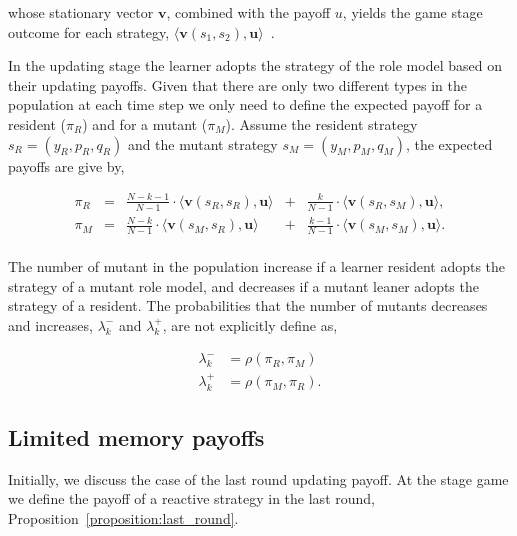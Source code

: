 \documentclass[11pt]{article}
\theoremstyle{plainCl1}
\theoremstyle{plainCl2}
\begin{document}
whose stationary vector \(\mathbf{v}\), combined with the payoff \(u\), yields
the game stage outcome for each strategy,
\(\langle\mathbf{v}(s_1,s_2),\mathbf{u}\rangle\)~\cite{Hauert1997}.


In the updating stage the learner adopts the strategy of the role model based on
their updating payoffs. Given that there are only two different types in the
population at each time step we only need to define the expected payoff for a
resident (\(\pi_R\)) and for a mutant (\(\pi_M\)). Assume the resident strategy
\(s_R = (y_R, p_R, q_R)\) and the mutant strategy \(s_M = (y_M, p_M, q_M)\), the
expected payoffs are give by,

\begin{equation} \label{Eq:ExpPay}
  \begin{array}{lcrcr}
  \displaystyle \pi_R	&=	&\displaystyle \frac{N\!-\!k\!-\!1}{N-1}\cdot \langle\mathbf{v}(s_R,s_R),\mathbf{u}\rangle	&+	&\displaystyle\frac{k}{N-1}\cdot \langle\mathbf{v}(s_R,s_M),\mathbf{u}\rangle,\\[0.5cm]
  \displaystyle \pi_M	&=	&\displaystyle\frac{N-k}{N-1}\cdot \langle\mathbf{v}(s_M,s_R),\mathbf{u}\rangle&+	&\displaystyle\frac{k-1}{N-1}\cdot \langle\mathbf{v}(s_M,s_M),\mathbf{u}\rangle.\\
  \end{array}
\end{equation}

The number of mutant in the population increase if a learner resident adopts the
strategy of a mutant role model, and decreases if a mutant leaner adopts the
strategy of a resident. The probabilities that the number of mutants decreases
and increases, \(\lambda^-_k\) and \(\lambda^+_k\), are not explicitly define
as,

\begin{align*} 
  \lambda^-_k &\!=\!\rho(\pi_R, \pi_M) \\
  \lambda^+_k &\!=\!\rho(\pi_M, \pi_R).
\end{align*}

\subsection*{Limited memory payoffs}

Initially, we discuss the case of the last round updating payoff. At the stage
game we define the payoff of a reactive strategy in the last round,
Proposition~\ref{proposition:last_round}.
\end{document}
